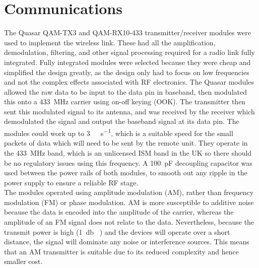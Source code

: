 \section{Communications}

The Quasar QAM-TX3 \cite{qam-tx} and QAM-RX10-433 \cite{qam-rx} transmitter/receiver modules were used to implement the wireless link. These had all the amplification, demodulation, filtering, and other signal processing required for a radio link fully integrated. Fully integrated modules were selected because they were cheap and simplified the design greatly, as the design only had to focus on low frequencies and not the complex effects associated with RF electronics. The Quasar modules allowed the raw data to be input to the data pin in baseband, then modulated this onto a \SI{433}{\mega\hertz} carrier using on-off keying (OOK). The transmitter then sent this modulated signal to its antenna, and was received by the receiver which demodulated the signal and output the baseband signal at its data pin. The modules could work up to \SI{3}{\kilo\bit\per\second}, which is a suitable speed for the small packets of data which will need to be sent by the remote unit. They operate in the \SI{433}{\mega\hertz} band, which is an unlicensed ISM band in the UK \cite{ism_band} so there should be no regulatory issues using this frequency. A \SI{100}{\pico\farad} decoupling capacitor was used between the power rails of both modules, to smooth out any ripple in the power supply to ensure a reliable RF stage.\\

The modules operated using amplitude modulation (AM), rather than frequency modulation (FM) or phase modulation. AM is more susceptible to additive noise because the data is encoded into the amplitude of the carrier, whereas the amplitude of an FM signal does not relate to the data. Nevertheless, because the transmit power is high (\SI{1}{\decibel\milli} \cite{qam-tx}) and the devices will operate over a short distance, the signal will dominate any noise or interference sources. This means that an AM transmitter is suitable due to its reduced complexity and hence smaller cost.\\

